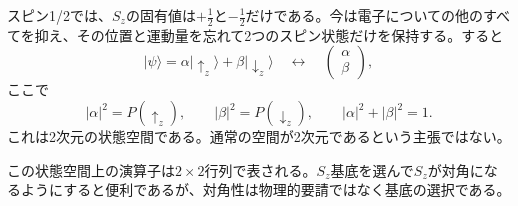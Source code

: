 \begin{classroomqa}
\end{classroomqa}

スピン1/2では、\(S_z\)の固有値は\(+\tfrac12\)と\(-\tfrac12\)だけである。今は電子についての他のすべてを抑え、その位置と運動量を忘れて2つのスピン状態だけを保持する。すると
\begin{equation}
|\psi\rangle
=
\alpha|\uparrow_z\rangle+\beta|\downarrow_z\rangle
\quad\longleftrightarrow\quad
\begin{pmatrix}
\alpha\\
\beta
\end{pmatrix},
\end{equation}
ここで
\begin{equation}
|\alpha|^2=P(\uparrow_z),
\qquad
|\beta|^2=P(\downarrow_z),
\qquad
|\alpha|^2+|\beta|^2=1.
\end{equation}
これは2次元の状態空間である。通常の空間が2次元であるという主張ではない。

\begin{classroomqa}
\end{classroomqa}

この状態空間上の演算子は\(2\times2\)行列で表される。\(S_z\)基底を選んで\(S_z\)が対角になるようにすると便利であるが、対角性は物理的要請ではなく基底の選択である。

\begin{classroomqa}
\end{classroomqa}

\begin{classroomqa}
\end{classroomqa}

